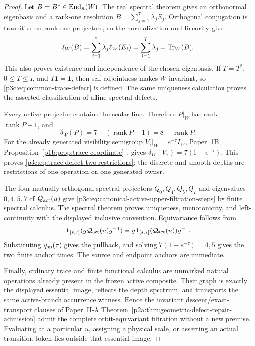 \documentclass[12pt,a4paper]{article}
\begin{document}
\begin{proof}
Let \(B=B^*\in\operatorname{End}_{\mathbb R}(W)\).  The real spectral theorem gives an
orthonormal eigenbasis and a rank-one resolution
\(B=\sum_{j=1}^{7}\lambda_jE_j\).  Orthogonal conjugation is transitive on
rank-one projectors, so the normalization and linearity give
\[
 \ell_W(B)=\sum_{j=1}^{7}\lambda_j\ell_W(E_j)
 =\sum_{j=1}^{7}\lambda_j=\operatorname{Tr}_W(B).
\]
This also proves existence and independence of the chosen eigenbasis.  If
\(T=T^*\), \(0\le T\le I\), and \(T\mathbf1=\mathbf1\), then self-adjointness
makes \(W\) invariant, so \eqref{p3c:eq:common-trace-defect} is defined.  The
same uniqueness calculation proves the asserted classification of affine
spectral defects.

Every active projector contains the scalar line.  Therefore
\(P|_W\) has rank \(\operatorname{rank}P-1\), and
\[
 \delta_W(P)=7-(\operatorname{rank}P-1)=8-\operatorname{rank}P.
\]
For the already generated visibility semigroup
\(V_\tau|_W=e^{-\tau}I_W\), Paper~1B,
Proposition~\ref{p1b:prop:trace-coordinate}~\cite{Kugelmann2026Paper1B},
gives \(\delta_W(V_\tau)=7(1-e^{-\tau})\).  This proves
\eqref{p3c:eq:trace-defect-two-restrictions}: the discrete and smooth depths
are restrictions of one operation on one generated owner.

The four mutually orthogonal spectral projectors
\(Q_0,Q_4,Q_5,Q_7\) and eigenvalues \(0,4,5,7\) of
\(\mathcal Q_{\rm act}(u)\) give
\eqref{p3c:eq:canonical-active-upper-filtration-steps} by finite spectral
calculus.  The spectral theorem proves uniqueness, monotonicity, and
left-continuity with the displayed inclusive convention.  Equivariance follows
from
\[
 \mathbf1_{[s,7]}(g\mathcal Q_{\rm act}(u)g^{-1})
 =g\mathbf1_{[s,7]}(\mathcal Q_{\rm act}(u))g^{-1}.
\]
Substituting \(q_{\rm sp}(\tau)\) gives the pullback, and solving
\(7(1-e^{-\tau})=4,5\) gives the two finite anchor times.  The source and
endpoint anchors are immediate.

Finally, ordinary trace and finite functional calculus are unmarked natural
operations already present in the frozen active composite.  Their graph is
exactly the displayed essential image, reflects the depth spectrum, and
transports the same active-branch occurrence witness.  Hence the invariant
descent/exact-transport clauses of Paper~II-A
Theorem~\ref{p2a:thm:geometric-defect-repair-admission} admit the complete
orbit-equivariant filtration without a new premise.  Evaluating at a
particular \(u\), assigning a physical scale, or asserting an actual
transition token lies outside that essential image.
\end{proof}
\end{document}
